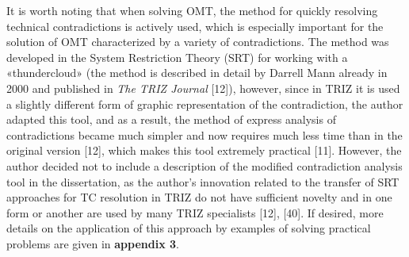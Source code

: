 \documentclass[11pt,a4paper]{book}
\begin{document}
It is worth noting that when solving OMT, the method for quickly resolving
technical contradictions is actively used, which is especially important for
the solution of OMT characterized by a variety of contradictions. The method
was developed in the System Restriction Theory (SRT) for working with a
«thundercloud» (the method is described in detail by Darrell Mann already in
2000 and published in \emph{The TRIZ Journal} [12]), however, since in TRIZ it
is used a slightly different form of graphic representation of the
contradiction, the author adapted this tool, and as a result, the method of
express analysis of contradictions became much simpler and now requires much
less time than in the original version [12], which makes this tool extremely
practical [11].  However, the author decided not to include a description of
the modified contradiction analysis tool in the dissertation, as the author’s
innovation related to the transfer of SRT approaches for TC resolution in TRIZ
do not have sufficient novelty and in one form or another are used by many
TRIZ specialists [12], [40]. If desired, more details on the application of
this approach by examples of solving practical problems are given in
\textbf{appendix 3}.
\end{document}
